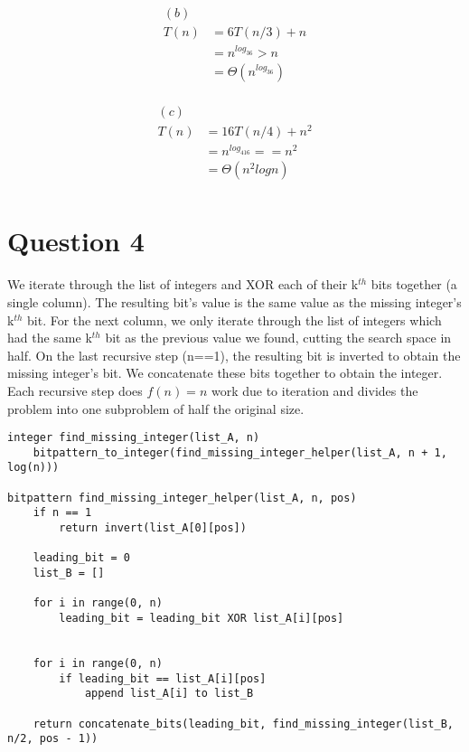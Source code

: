 \documentclass[11pt, oneside]{article}
\begin{document}
\begin{align*} 
(b) \\
T(n) &= 6T(n/3) + n \\
&= n^{log_36} > n \\
&= \Theta(n^{log_36}) \\
\end{align*}

\begin{align*} 
(c) \\
T(n) &= 16T(n/4) + n^2 \\
&= n^{log_416} == n^2 \\
&= \Theta(n^2logn) \\
\end{align*}

\clearpage

\section{Question 4}

We iterate through the list of integers and XOR each of their k$^{th}$ bits together (a single column). The resulting bit's value is the same value as the missing integer's k$^{th}$ bit. For the next column, we only iterate through the list of integers which had the same k$^{th}$ bit as the previous value we found, cutting the search space in half. On the last recursive step (n==1), the resulting bit is inverted to obtain the missing integer's bit. We concatenate these bits together to obtain the integer. Each recursive step does $f(n)=n$ work due to iteration and divides the problem into one subproblem of half the original size.

\begin{lstlisting}
integer find_missing_integer(list_A, n)
    bitpattern_to_integer(find_missing_integer_helper(list_A, n + 1, log(n)))

bitpattern find_missing_integer_helper(list_A, n, pos)
    if n == 1
        return invert(list_A[0][pos])

    leading_bit = 0
    list_B = []

    for i in range(0, n)
        leading_bit = leading_bit XOR list_A[i][pos]


    for i in range(0, n)
        if leading_bit == list_A[i][pos]
            append list_A[i] to list_B

    return concatenate_bits(leading_bit, find_missing_integer(list_B, n/2, pos - 1))
\end{lstlisting}
\end{document}
